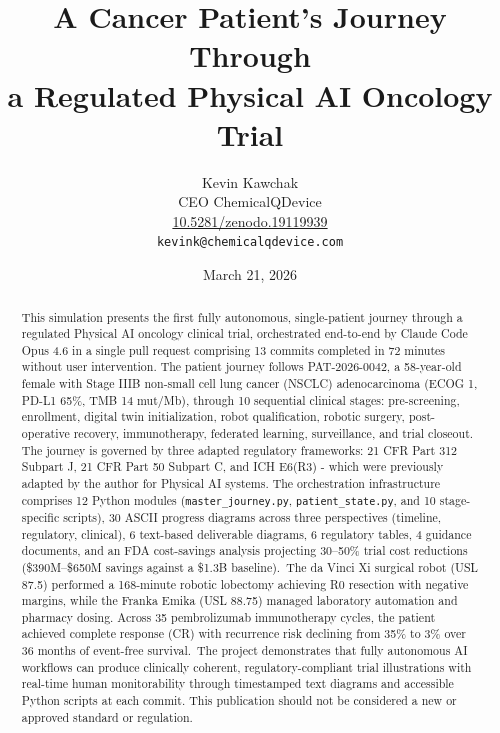\documentclass{article}
\title{A Cancer Patient's Journey Through\\a Regulated Physical AI Oncology Trial}
\author{
  Kevin Kawchak\hspace{2pt}\orcidicon{0009-0007-5457-8667} \\
  CEO ChemicalQDevice\\
  \href{https://doi.org/10.5281/zenodo.19119939}{10.5281/zenodo.19119939} \\
  \texttt{kevink@chemicalqdevice.com}
}
\date{March 21, 2026}
\begin{document}
\maketitle

\begin{abstract}
This simulation presents the first fully autonomous, single-patient journey through a regulated Physical AI oncology clinical trial, orchestrated end-to-end by Claude Code Opus 4.6 in a single pull request comprising 13 commits completed in 72 minutes without user intervention. The patient journey follows PAT-2026-0042, a 58-year-old female with Stage IIIB non-small cell lung cancer (NSCLC) adenocarcinoma (ECOG 1, PD-L1 65\%, TMB 14 mut/Mb), through 10 sequential clinical stages: pre-screening, enrollment, digital twin initialization, robot qualification, robotic surgery, post-operative recovery, immunotherapy, federated learning, surveillance, and trial closeout. The journey is governed by three adapted regulatory frameworks: 21 CFR Part 312 Subpart J, 21 CFR Part 50 Subpart C, and ICH E6(R3) - which were previously adapted by the author for Physical AI systems. The orchestration infrastructure comprises 12 Python modules (\texttt{master\_journey.py}, \texttt{patient\_state.py}, and 10 stage-specific scripts), 30 ASCII progress diagrams across three perspectives (timeline, regulatory, clinical), 6 text-based deliverable diagrams, 6 regulatory tables, 4 guidance documents, and an FDA cost-savings analysis projecting 30--50\% trial cost reductions (\$390M--\$650M savings against a \$1.3B baseline).\ The da Vinci Xi surgical robot (USL 87.5) performed a 168-minute robotic lobectomy achieving R0 resection with negative margins, while the Franka Emika (USL 88.75) managed laboratory automation and pharmacy dosing. Across 35 pembrolizumab immunotherapy cycles, the patient achieved complete response (CR) with recurrence risk declining from 35\% to 3\% over 36 months of event-free survival.\ The project demonstrates that fully autonomous AI workflows can produce clinically coherent, regulatory-compliant trial illustrations with real-time human monitorability through timestamped text diagrams and accessible Python scripts at each commit. This publication should not be considered a new or approved standard or regulation.
\end{abstract}


\vspace{-0.2cm}
\end{document}
